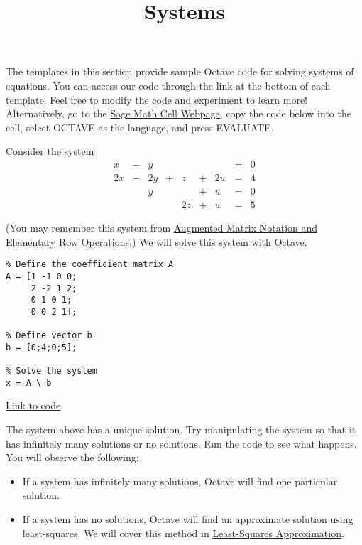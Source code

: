 \documentclass{ximera}
\title{Systems} \license{CC BY-NC-SA 4.0}
\begin{document}
\begin{abstract}
\end{abstract}
\maketitle

The templates in this section provide sample Octave code for solving systems of equations. You can access our code through the link at the bottom of each template.  Feel free to modify the code and experiment to learn more!  Alternatively, go to the \href{https://sagecell.sagemath.org/}{Sage Math Cell Webpage}, copy the code below into the cell, select OCTAVE as the language, and press EVALUATE.  

\begin{template}\label{temp:systems1}
Consider the system
\begin{equation}
\begin{array}{ccccccccc}
      x &- &y&&&&&= &0 \\
	 2x& -&2y&+&z&+&2w&=&4\\
     & &y&&&+&w&=&0\\
     & &&&2z&+&w&=&5
    \end{array}
    \end{equation}

 (You may remember this system from \href{https://ximera.osu.edu/linearalgebrav3/LinearAlgebraInteractiveIntro/SYS-0020/main}{Augmented Matrix Notation and Elementary Row Operations}.)  We will solve this system with Octave.   
\begin{verbatim}
% Define the coefficient matrix A
A = [1 -1 0 0;
     2 -2 1 2;
     0 1 0 1;
     0 0 2 1];

% Define vector b
b = [0;4;0;5];

% Solve the system 
x = A \ b
\end{verbatim}

\href{https://sagecell.sagemath.org/?z=eJxFjsEKwjAQRO-B_Ye59FjYBD0FDwH_wGP1YMIGA7aBNpT69yZIcG-PeczsgKvEtAjKSxCyxJhCkqVgfpY1HXCkHC6YNEYNBltSaGcwGmiYzowW6z9yVfSjMqmhb-wSSl7hSfnWyfZk2Z67dMvv_ffH9tmKzCB1VM3hDv8FLh8nkA==&lang=octave&interacts=eJyLjgUAARUAuQ==}{Link to code}.

\begin{warning}
    The system above has a unique solution.  Try manipulating the system so that it has infinitely many solutions or no solutions.  Run the code to see what happens.  You will observe the following:

\begin{itemize}
    \item If a system has infinitely many solutions, Octave will find one particular solution.
    \item If a system has no solutions, Octave will find an approximate solution using least-squares.  We will cover this method in \href{https://ximera.osu.edu/linearalgebrav3/LinearAlgebraInteractiveIntro/RTH-0030/main}{Least-Squares Approximation}.
\end{itemize}
\end{warning}

\end{template}
\end{document}
